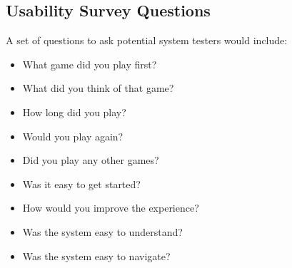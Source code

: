 \documentclass[12pt, titlepage]{article}
\begin{document}
\subsection{Usability Survey Questions}

A set of questions to ask potential system testers would include:
\begin{itemize}
    \item What game did you play first?
    \item What did you think of that game?
    \item How long did you play?
    \item Would you play again?
    \item Did you play any other games?
    \item Was it easy to get started?
    \item How would you improve the experience?
    \item Was the system easy to understand?
    \item Was the system easy to navigate?
\end{itemize}
\end{document}
